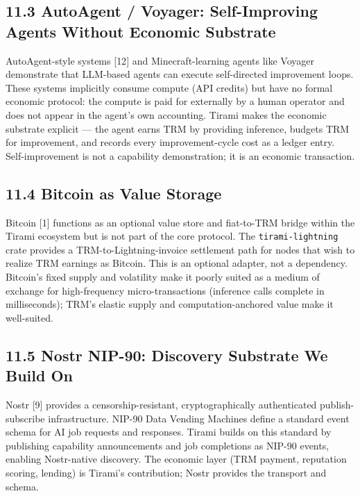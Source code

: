 \documentclass[
  11pt,
]{article}
\begin{document}
\subsection{11.3 AutoAgent / Voyager: Self-Improving Agents Without
Economic
Substrate}\label{autoagent-voyager-self-improving-agents-without-economic-substrate}

AutoAgent-style systems {[}12{]} and Minecraft-learning agents like
Voyager demonstrate that LLM-based agents can execute self-directed
improvement loops. These systems implicitly consume compute (API
credits) but have no formal economic protocol: the compute is paid for
externally by a human operator and does not appear in the agent's own
accounting. Tirami makes the economic substrate explicit --- the agent
earns TRM by providing inference, budgets TRM for improvement, and
records every improvement-cycle cost as a ledger entry. Self-improvement
is not a capability demonstration; it is an economic transaction.

\subsection{11.4 Bitcoin as Value
Storage}\label{bitcoin-as-value-storage}

Bitcoin {[}1{]} functions as an optional value store and fiat-to-TRM
bridge within the Tirami ecosystem but is not part of the core protocol.
The \texttt{tirami-lightning} crate provides a TRM-to-Lightning-invoice
settlement path for nodes that wish to realize TRM earnings as Bitcoin.
This is an optional adapter, not a dependency. Bitcoin's fixed supply
and volatility make it poorly suited as a medium of exchange for
high-frequency micro-transactions (inference calls complete in
milliseconds); TRM's elastic supply and computation-anchored value make
it well-suited.

\subsection{11.5 Nostr NIP-90: Discovery Substrate We Build
On}\label{nostr-nip-90-discovery-substrate-we-build-on}

Nostr {[}9{]} provides a censorship-resistant, cryptographically
authenticated publish-subscribe infrastructure. NIP-90 Data Vending
Machines define a standard event schema for AI job requests and
responses. Tirami builds on this standard by publishing capability
announcements and job completions as NIP-90 events, enabling
Nostr-native discovery. The economic layer (TRM payment, reputation
scoring, lending) is Tirami's contribution; Nostr provides the transport
and schema.
\end{document}
